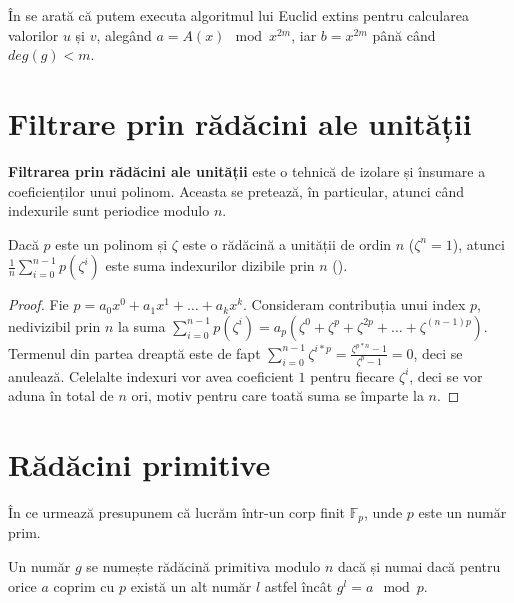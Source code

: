 În \cite{sugiyama} se arată că putem executa algoritmul lui Euclid extins pentru
calcularea valorilor $u$ și $v$, alegând $a = A(x) \mod x^{2m}$, iar
$b = x^{2m}$ până când $deg(g) < m$.

\pagebreak

\section{Filtrare prin rădăcini ale unității}

\label{rootsofunityfilter}

\textbf{Filtrarea prin rădăcini ale unității} \cite{rootsofunityfilter} este o tehnică de izolare și
însumare a coeficienților unui polinom. Aceasta se pretează, în particular,
atunci când indexurile sunt periodice modulo $n$.

\begin{thm}
  Dacă $p$ este un polinom și $\zeta$ este o rădăcină a unității de ordin
  $n$ ($\zeta^{n} = 1$), atunci $\frac{1}{n} \displaystyle\sum\limits_{i=0}^{n-1} p(\zeta^{i})$
  este suma indexurilor dizibile prin $n$ (\cite{complexnumbers}).
\end{thm}

\begin{proof}
  Fie $p = a_{0}x^{0} + a_{1}x^{1} + \ldots + a_{k}x^{k}$. Consideram contribuția
  unui index $p$, nedivizibil prin $n$ la suma
  $\displaystyle\sum\limits_{i=0}^{n-1} p(\zeta^{i}) = a_{p}(\zeta^{0} + \zeta^{p} + \zeta^{2p} + \ldots + \zeta^{(n-1)p})$.
  Termenul din partea dreaptă este de fapt $\displaystyle\sum\limits_{i=0}^{n-1} \zeta^{i*p} = \frac{\zeta^{p*n} - 1}{\zeta^{p} - 1} = 0$,
  deci se anulează. Celelalte indexuri vor avea coeficient $1$ pentru fiecare
  $\zeta^{i}$, deci se vor aduna în total de $n$ ori, motiv pentru care toată suma
  se împarte la $n$.
\end{proof}


\pagebreak

\section{Rădăcini primitive}
\label{primitiveroot}

\cite{primitiveroot} În ce urmează presupunem că lucrăm într-un corp finit $\mathbb{F}_{p}$, unde $p$ este un număr prim.

\begin{defn}
  Un număr $g$ se numește rădăcină primitiva modulo $n$ dacă și numai dacă pentru orice $a$ coprim cu $p$ există un alt număr
  $l$ astfel încât $g^{l} = a \mod p$.
\end{defn}

